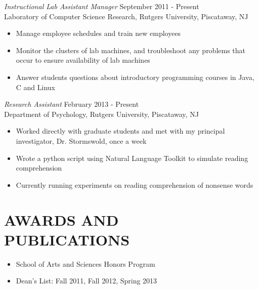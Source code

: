 \documentclass[margin]{res}
\begin{document}
\begin{resume}
                {\sl Instructional Lab Assistant Manager} \hfill            September 2011 - Present \\
                Laboratory of Computer Science Research, Rutgers University, Piscataway, NJ
                 \begin{itemize}  \itemsep -2pt %
                 \item Manage employee schedules and train new employees
                 \item Monitor the clusters of lab machines, and troubleshoot any problems that occur to ensure availability of lab machines
                 \item  Answer students questions about introductory programming courses in Java, C and Linux
                 \end{itemize} 
                 
                {\sl Research Assistant} \hfill        February 2013 - Present \\
                Department of Psychology, Rutgers University, Piscataway, NJ
                  \begin{itemize} \itemsep -2pt
                   \item Worked directly with graduate students and met with my principal investigator, Dr. Stormswold, once a week
		    \item Wrote a python script using Natural Language Toolkit to simulate reading comprehension
		    \item Currently running experiments on reading comprehension of nonsense words
                   \end{itemize} 
 
\section{AWARDS AND\\ PUBLICATIONS}
		\begin{itemize} \itemsep -2pt
		 \item School of Arts and Sciences Honors Program
		 \item Dean's List: Fall 2011, Fall 2012, Spring 2013
		\end{itemize}



\end{resume}
\end{document}

